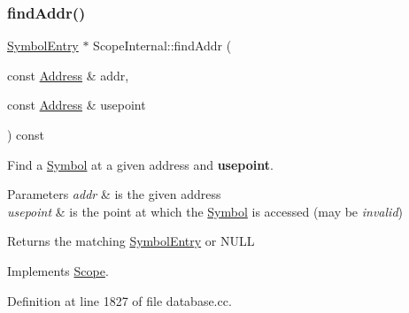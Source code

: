 \subsubsection{\texorpdfstring{findAddr()}{findAddr()}}
{\footnotesize\ttfamily \mbox{\hyperlink{class_symbol_entry}{Symbol\+Entry}} $\ast$ Scope\+Internal\+::find\+Addr (\begin{DoxyParamCaption}\item[{const \mbox{\hyperlink{class_address}{Address}} \&}]{addr,  }\item[{const \mbox{\hyperlink{class_address}{Address}} \&}]{usepoint }\end{DoxyParamCaption}) const\hspace{0.3cm}{\ttfamily [virtual]}}



Find a \mbox{\hyperlink{class_symbol}{Symbol}} at a given address and {\bfseries{usepoint}}. 


\begin{DoxyParams}{Parameters}
{\em addr} & is the given address \\
\hline
{\em usepoint} & is the point at which the \mbox{\hyperlink{class_symbol}{Symbol}} is accessed (may be {\itshape invalid}) \\
\hline
\end{DoxyParams}
\begin{DoxyReturn}{Returns}
the matching \mbox{\hyperlink{class_symbol_entry}{Symbol\+Entry}} or N\+U\+LL 
\end{DoxyReturn}


Implements \mbox{\hyperlink{class_scope_aae4ea61f9a55ddfc9defd8548654c8e5}{Scope}}.



Definition at line 1827 of file database.\+cc.

